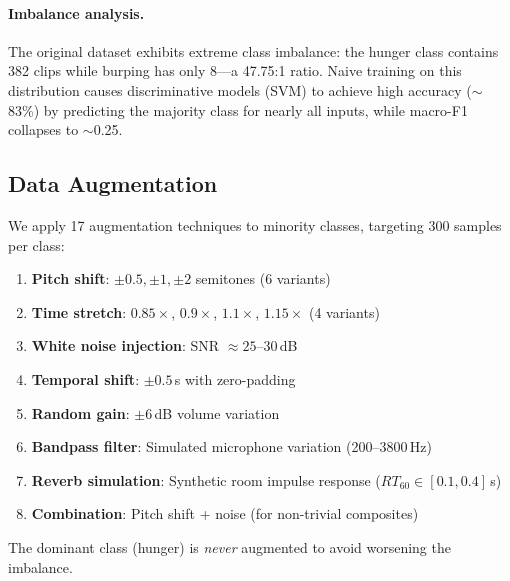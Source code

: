 \documentclass[11pt,a4paper]{article}
\begin{document}
\paragraph{Imbalance analysis.}
The original dataset exhibits extreme class imbalance: the hunger class
contains 382 clips while burping has only 8---a 47.75:1 ratio. Naive
training on this distribution causes discriminative models (SVM) to
achieve high accuracy ($\sim$83\%) by predicting the majority class for
nearly all inputs, while macro-F1 collapses to $\sim$0.25.

\subsection{Data Augmentation}
\label{sec:augmentation}

We apply 17 augmentation techniques to minority classes, targeting 300
samples per class:

\begin{enumerate}[nosep]
  \item \textbf{Pitch shift}: $\pm 0.5, \pm 1, \pm 2$ semitones (6 variants)
  \item \textbf{Time stretch}: $0.85\times$, $0.9\times$, $1.1\times$, $1.15\times$ (4 variants)
  \item \textbf{White noise injection}: SNR $\approx 25$--$30$\,dB
  \item \textbf{Temporal shift}: $\pm 0.5$\,s with zero-padding
  \item \textbf{Random gain}: $\pm 6$\,dB volume variation
  \item \textbf{Bandpass filter}: Simulated microphone variation (200--3800\,Hz)
  \item \textbf{Reverb simulation}: Synthetic room impulse response ($RT_{60} \in [0.1, 0.4]$\,s)
  \item \textbf{Combination}: Pitch shift + noise (for non-trivial composites)
\end{enumerate}

\noindent
The dominant class (hunger) is \textit{never} augmented to avoid
worsening the imbalance.
\end{document}
